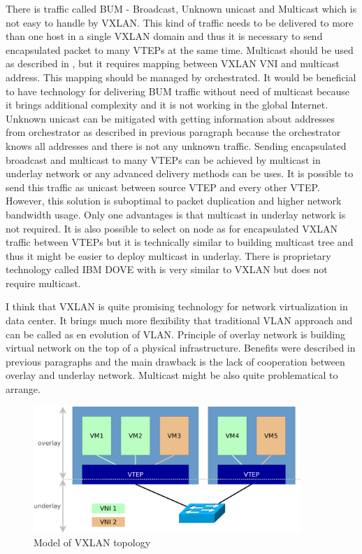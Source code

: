 There is traffic called \Ac{BUM} - Broadcast, Unknown unicast and Multicast which is not easy to handle by \Ac{VXLAN}. This kind of traffic needs to be delivered to more than one host in a single \Ac{VXLAN} domain and thus it is necessary to send encapsulated packet to many \Ac{VTEP}s at the same time. Multicast should be used as described in \cite{rfc7348}, but it requires mapping between \Ac{VXLAN} \Ac{VNI} and multicast address. This mapping should be managed by orchestrated. 
It would be beneficial to have technology for delivering \Ac{BUM} traffic without need of multicast because it brings additional complexity and it is not working in the global Internet. Unknown unicast can be mitigated with getting information about addresses from orchestrator as described in previous paragraph because the orchestrator knows all addresses and there is not any unknown traffic. 
Sending encapsulated broadcast and multicast to many \Ac{VTEP}s can be achieved by multicast in underlay network or any advanced delivery methods can be uses. It is possible to send this traffic as unicast between source \Ac{VTEP} and every other \Ac{VTEP}. However, this solution is suboptimal to packet duplication and higher network bandwidth usage. Only one advantages is that multicast in underlay network is not required. It is also possible to select on node as  for encapsulated \Ac{VXLAN} traffic between \Ac{VTEP}s but it is technically similar to building multicast tree and thus it might be easier to deploy multicast in underlay.
There is proprietary technology called IBM DOVE with is very similar to \Ac{VXLAN} but does not require multicast.


I think that \Ac{VXLAN} is quite promising technology for network virtualization in data center. It brings much more flexibility that traditional \Ac{VLAN} approach and can be called as en evolution of \Ac{VLAN}. Principle of overlay network is building virtual network on the top of a physical infrastructure. Benefits were described in previous paragraphs and the main drawback is the lack of cooperation between overlay and underlay network. Multicast might be also quite problematical to arrange.

\begin{figure}[htb]
	\begin{center}
	\includegraphics[width=0.9\textwidth]{vxlan.png}
	\end{center}
	\caption{Model of VXLAN topology}
	\label{img:vxlan-topology}
\end{figure}

